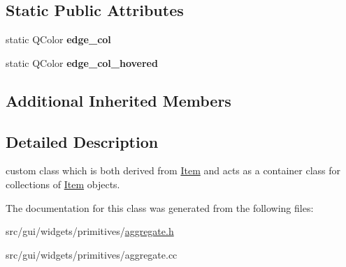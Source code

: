 \subsection*{Static Public Attributes}
\begin{DoxyCompactItemize}
\item 
static Q\+Color {\bfseries edge\+\_\+col}\hypertarget{classprim_1_1Aggregate_a7c9917eb75f83ee7e89ffa8ca126d55c}{}\label{classprim_1_1Aggregate_a7c9917eb75f83ee7e89ffa8ca126d55c}

\item 
static Q\+Color {\bfseries edge\+\_\+col\+\_\+hovered}\hypertarget{classprim_1_1Aggregate_a847829d621b79311f9d234fb12a2ff1e}{}\label{classprim_1_1Aggregate_a847829d621b79311f9d234fb12a2ff1e}

\end{DoxyCompactItemize}
\subsection*{Additional Inherited Members}


\subsection{Detailed Description}
custom class which is both derived from \hyperlink{classprim_1_1Item}{Item} and acts as a container class for collections of \hyperlink{classprim_1_1Item}{Item} objects. 

The documentation for this class was generated from the following files\+:\begin{DoxyCompactItemize}
\item 
src/gui/widgets/primitives/\hyperlink{aggregate_8h}{aggregate.\+h}\item 
src/gui/widgets/primitives/aggregate.\+cc\end{DoxyCompactItemize}
